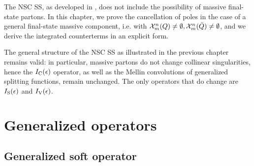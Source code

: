 
The NSC SS, as developed in \cite{rontsch-2023, rontsch-2503, rontsch-2509}, does not include the possibility of massive final-state partons. In this chapter, we prove the cancellation of poles in the case of a general final-state massive component, i.e. with $ \mathcal{X}^{n}_{m}(Q) \neq \emptyset , \mathcal{X}^{n}_{m}(\bar{Q}) \neq \emptyset $, and we derive the integrated counterterms in an explicit form.

The general structure of the NSC SS as illustrated in the previous chapter remains valid: in particular, massive partons do not change collinear singularities, hence the $ I_\text{C}(\epsilon) $ operator, as well as the Mellin convolutions of generalized splitting functions, remain unchanged. The only operators that do change are $ I_\text{S}(\epsilon) $ and $ I_\text{V}(\epsilon) $.

\section{Generalized operators}

\subsection{Generalized soft operator}

